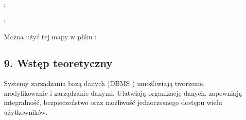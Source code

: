 \documentclass[a4paper,11pt,openany,english]{sphinxmanual}
\begin{document}
\sphinxAtStartPar
{}

\begin{sphinxVerbatim}[commandchars=\\\{\}]
  
  
\end{sphinxVerbatim}

\sphinxAtStartPar
{} :

\begin{sphinxVerbatim}[commandchars=\\\{\}]
             
                
\end{sphinxVerbatim}

\sphinxAtStartPar
{} :

\begin{sphinxVerbatim}[commandchars=\\\{\}]
              
        
\end{sphinxVerbatim}

\sphinxAtStartPar
Można użyć tej mapy w pliku :

\begin{sphinxVerbatim}[commandchars=\\\{\}]
              
\end{sphinxVerbatim}


\subsection{9. Wstęp teoretyczny}
\label{\detokenize{rozdzial2/Konfiguracja_baz_danych/Konfiguracja_baz_danych:wstep-teoretyczny}}
\sphinxAtStartPar
Systemy zarządzania bazą danych (DBMS \textendash{} ) umożliwiają tworzenie, modyfikowanie i zarządzanie danymi. Ułatwiają organizację danych, zapewniają integralność, bezpieczeństwo oraz możliwość jednoczesnego dostępu wielu użytkowników.
\end{document}
